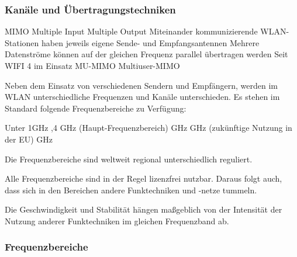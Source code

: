 \documentclass[asp1.tex]{subfiles}
\begin{document}
\subsubsection{Kanäle und Übertragungstechniken}

\begin{outline}
    \1 MIMO
        \2 Multiple Input Multiple Output
        \2 Miteinander kommunizierende WLAN-Stationen haben jeweils eigene Sende- und Empfangsantennen
        \2 \textrightarrow\space Mehrere Datenströme können auf der gleichen Frequenz parallel übertragen werden
        \2 Seit WIFI 4 im Einsatz
    \1 MU-MIMO
        \2 Multiuser-MIMO
\end{outline}

Neben dem Einsatz von verschiedenen Sendern und Empfängern, werden im WLAN unterschiedliche Frequenzen und Kanäle unterschieden.
Es stehen im Standard folgende Frequenzbereiche zu Verfügung:
\begin{outline}
    \1 Unter 1GHz
    ,4 GHz (Haupt-Frequenzbereich)
     GHz
     GHz (zukünftige Nutzung in der EU)
     GHz
\end{outline}

Die Frequenzbereiche sind weltweit regional unterschiedlich reguliert.

Alle Frequenzbereiche sind in der Regel lizenzfrei nutzbar. Daraus folgt auch, dass sich in den Bereichen andere Funktechniken und -netze tummeln.

Die Geschwindigkeit und Stabilität hängen maßgeblich von der Intensität der Nutzung anderer Funktechniken im gleichen Frequenzband ab.

\break

\subsubsection{Frequenzbereiche}
\end{document}

